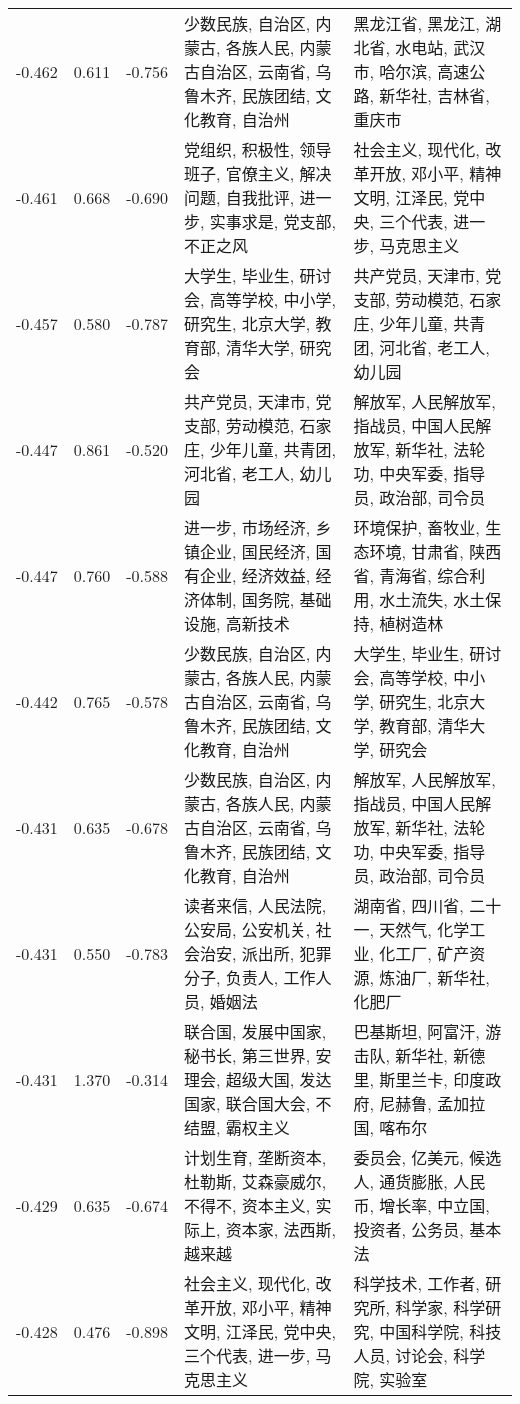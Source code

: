 \begin{tabular}{cccp{5cm}p{5cm}}
-0.462 & 0.611 & -0.756 & 少数民族, 自治区, 内蒙古, 各族人民, 内蒙古自治区, 云南省, 乌鲁木齐, 民族团结, 文化教育, 自治州 & 黑龙江省, 黑龙江, 湖北省, 水电站, 武汉市, 哈尔滨, 高速公路, 新华社, 吉林省, 重庆市 \\
-0.461 & 0.668 & -0.690 & 党组织, 积极性, 领导班子, 官僚主义, 解决问题, 自我批评, 进一步, 实事求是, 党支部, 不正之风 & 社会主义, 现代化, 改革开放, 邓小平, 精神文明, 江泽民, 党中央, 三个代表, 进一步, 马克思主义 \\
-0.457 & 0.580 & -0.787 & 大学生, 毕业生, 研讨会, 高等学校, 中小学, 研究生, 北京大学, 教育部, 清华大学, 研究会 & 共产党员, 天津市, 党支部, 劳动模范, 石家庄, 少年儿童, 共青团, 河北省, 老工人, 幼儿园 \\
-0.447 & 0.861 & -0.520 & 共产党员, 天津市, 党支部, 劳动模范, 石家庄, 少年儿童, 共青团, 河北省, 老工人, 幼儿园 & 解放军, 人民解放军, 指战员, 中国人民解放军, 新华社, 法轮功, 中央军委, 指导员, 政治部, 司令员 \\
-0.447 & 0.760 & -0.588 & 进一步, 市场经济, 乡镇企业, 国民经济, 国有企业, 经济效益, 经济体制, 国务院, 基础设施, 高新技术 & 环境保护, 畜牧业, 生态环境, 甘肃省, 陕西省, 青海省, 综合利用, 水土流失, 水土保持, 植树造林 \\
-0.442 & 0.765 & -0.578 & 少数民族, 自治区, 内蒙古, 各族人民, 内蒙古自治区, 云南省, 乌鲁木齐, 民族团结, 文化教育, 自治州 & 大学生, 毕业生, 研讨会, 高等学校, 中小学, 研究生, 北京大学, 教育部, 清华大学, 研究会 \\
-0.431 & 0.635 & -0.678 & 少数民族, 自治区, 内蒙古, 各族人民, 内蒙古自治区, 云南省, 乌鲁木齐, 民族团结, 文化教育, 自治州 & 解放军, 人民解放军, 指战员, 中国人民解放军, 新华社, 法轮功, 中央军委, 指导员, 政治部, 司令员 \\
-0.431 & 0.550 & -0.783 & 读者来信, 人民法院, 公安局, 公安机关, 社会治安, 派出所, 犯罪分子, 负责人, 工作人员, 婚姻法 & 湖南省, 四川省, 二十一, 天然气, 化学工业, 化工厂, 矿产资源, 炼油厂, 新华社, 化肥厂 \\
-0.431 & 1.370 & -0.314 & 联合国, 发展中国家, 秘书长, 第三世界, 安理会, 超级大国, 发达国家, 联合国大会, 不结盟, 霸权主义 & 巴基斯坦, 阿富汗, 游击队, 新华社, 新德里, 斯里兰卡, 印度政府, 尼赫鲁, 孟加拉国, 喀布尔 \\
-0.429 & 0.635 & -0.674 & 计划生育, 垄断资本, 杜勒斯, 艾森豪威尔, 不得不, 资本主义, 实际上, 资本家, 法西斯, 越来越 & 委员会, 亿美元, 候选人, 通货膨胀, 人民币, 增长率, 中立国, 投资者, 公务员, 基本法 \\
-0.428 & 0.476 & -0.898 & 社会主义, 现代化, 改革开放, 邓小平, 精神文明, 江泽民, 党中央, 三个代表, 进一步, 马克思主义 & 科学技术, 工作者, 研究所, 科学家, 科学研究, 中国科学院, 科技人员, 讨论会, 科学院, 实验室 \\

\end{tabular}
